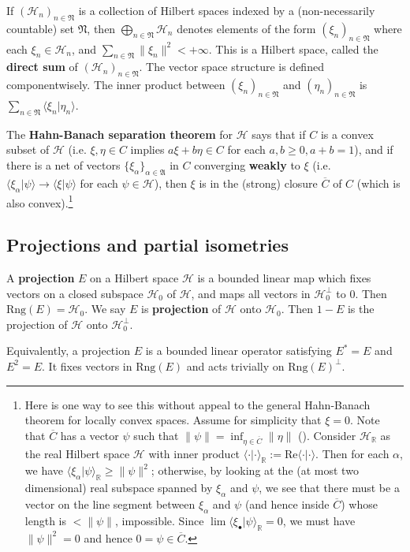 \documentclass[12pt,b5paper,notitlepage]{article}
\theoremstyle{definition}
\theoremstyle{plain}
\newcommand{\fk}{\mathfrak}
\newcommand{\mc}{\mathcal}
\newcommand{\ovl}{\overline}
\newcommand{\bk}[1]{\langle {#1}\rangle}
\newcommand{\blt}{\bullet}
\newcommand{\Rbb}{\mathbb R}
\newcommand{\Rng}{\mathrm{Rng}}
\numberwithin{equation}{section}
\begin{document}
If $(\mc H_n)_{n\in\fk N}$ is a collection of Hilbert spaces indexed by a (non-necessarily countable) set $\fk N$, then  $\bigoplus_{n\in\fk N}\mc H_n$ denotes elements of the form $(\xi_n)_{n\in\fk N}$ where each $\xi_n\in\mc H_n$, and $\sum_{n\in\fk N}\lVert\xi_n\lVert^2<+\infty$. This is a Hilbert space, called the \textbf{direct sum} of $(\mc H_n)_{n\in\fk N}$. The vector space structure is defined componentwisely. The inner product between $(\xi_n)_{n\in\fk N}$ and $(\eta_n)_{n\in\fk N}$ is $\sum_{n\in\fk N}\bk{\xi_n|\eta_n}$.

The \textbf{Hahn-Banach separation theorem} for $\mc H$ says that if $C$ is a convex subset of $\mc H$ (i.e. $\xi,\eta\in C$ implies $a\xi+b\eta\in C$ for each $a,b\geq 0,a+b=1$), and if there is a net of vectors $\{\xi_\alpha\}_{\alpha\in\fk A}$ in $C$ converging \textbf{weakly} to $\xi$ (i.e. $\bk{\xi_\alpha|\psi}\rightarrow\bk{\xi|\psi}$ for each $\psi\in\mc H$), then $\xi$ is in the (strong) closure $\ovl C$ of $C$ (which is also convex).\footnote{Here is one way to see this without appeal to the general Hahn-Banach theorem for locally convex spaces. Assume for simplicity that $\xi=0$. Note that $\ovl C$ has a vector $\psi$ such that $\lVert\psi\lVert=\inf_{\eta\in \ovl C}\lVert \eta\lVert$ (\cite[Thm. 4.10]{Rud-R}). Consider $\mc H_\Rbb$ as the real Hilbert space $\mc H$ with inner product $\bk{\cdot|\cdot}_\Rbb:=\mathrm{Re}\bk{\cdot|\cdot}$.  Then for each $\alpha$, we have $\bk{\xi_\alpha|\psi}_\Rbb\geq\lVert \psi\lVert^2$; otherwise, by looking at the (at most two dimensional) real subspace spanned by $\xi_\alpha$ and $\psi$, we see that there must be a vector on the line segment between $\xi_\alpha$ and $\psi$ (and hence inside $\ovl C$) whose length is $<\lVert\psi\lVert$, impossible. Since $\lim\bk{\xi_\blt|\psi}_\Rbb=0$, we must have $\lVert \psi\lVert^2=0$ and hence $0=\psi\in\ovl C$.}

\subsection*{Projections and partial isometries}


A \textbf{projection} $E$ on a Hilbert space $\mc H$ is a bounded linear map which fixes vectors on a closed subspace $\mc H_0$ of $\mc H$, and maps all vectors in $\mc H_0^\perp$ to $0$. Then $\Rng(E)=\mc H_0$. We say $E$ is \textbf{projection} of $\mc H$ onto $\mc H_0$. Then $1-E$ is the projection of $\mc H$ onto $\mc H_0^\perp$. 

Equivalently, a projection $E$ is a bounded linear operator satisfying $E^*=E$ and $E^2=E$. It fixes vectors in $\Rng(E)$ and acts trivially on $\Rng(E)^\perp$.
\end{document}
